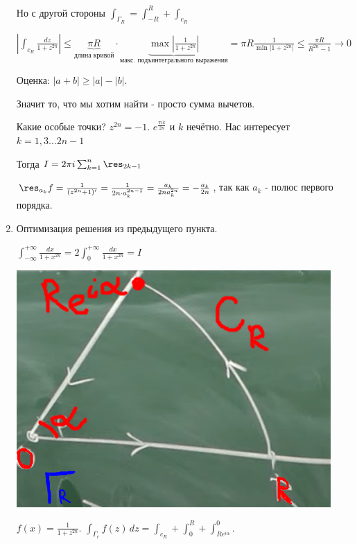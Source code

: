 \begin{example}
\begin{enumerate}
{            Но с другой стороны $\int_{\Gamma_R} = \int_{-R}^R + \int_{c_R}$

            $| \int_{c_R} \frac{dz}{1 + z^{2n}}| \leqslant \underbrace{\pi R}_{\text{длина кривой}} \cdot \underbrace{\max \left|\frac{1}{1 + z^{2n}}\right|}_{\text{макс. подъинтегрального выражения}} = \pi R \frac{1}{\min |1 + z^{2n}|}
            \leqslant \frac{\pi R}{R^{2n} - 1} \rightarrow 0$

            Оценка: $|a + b| \geqslant |a| - |b|$.

            Значит то, что мы хотим найти - просто сумма вычетов.

            Какие особые точки? $z^{2n} = -1$. $e^{\frac{\pi i k}{2n}}$ и $k$ нечётно.
            Нас интересует $k = 1, 3 \ldots 2n - 1$

            Тогда $I = 2 \pi i \sum_{k = 1}^n \res_{2k - 1}$

            $\res_{a_k} f = \frac{1}{(z^{2n} + 1)'} = \frac{1}{2n \cdot a_k^{2n - 1}} = \frac{a_k}{2na_k^{2n}} = -\frac{a_k}{2n}$, так как $a_k$ - полюс первого порядка. 
        }
        \item {
            Оптимизация решения из предыдущего пункта.

            $\int_{-\infty}^{+\infty} \frac{dx}{1 + x^{2n}} = 2\int_{0}^{+\infty} \frac{dx}{1 + x^{2n}} = I$

            \begin{center}
                \includegraphics[width=12cm]{assets/04-functions-of-complex-variables/example-3-cauchy-about-deductions.png}
            \end{center}

            $f(x) = \frac{1}{1 + z^{2n}}$. $\int_{\Gamma_r} f(z) \, dz = \int_{c_R} + \int_{0}^{R} + \int_{Re^{i\alpha}}^{0}$.
            
}
\end{enumerate}
\end{example}
